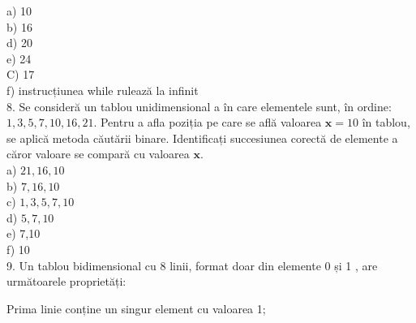 \documentclass[10pt]{article}
\begin{document}
a) 10\\
b) 16\\
d) 20\\
e) 24\\
C) 17\\
f) instrucțiunea while rulează la infinit\\
8. Se consideră un tablou unidimensional a în care elementele sunt, în ordine: $1,3,5,7,10,16,21$. Pentru a afla poziția pe care se află valoarea $\mathbf{x}=10$ în tablou, se aplică metoda căutării binare. Identificați succesiunea corectă de elemente a căror valoare se compară cu valoarea $\mathbf{x}$.\\
a) $21,16,10$\\
b) $7,16,10$\\
c) $1,3,5,7,10$\\
d) $5,7,10$\\
e) 7,10\\
f) 10\\
9. Un tablou bidimensional cu 8 linii, format doar din elemente 0 și 1 , are următoarele proprietăți:

Prima linie conține un singur element cu valoarea 1;
\end{document}
